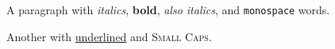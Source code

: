 A paragraph with \emph{italics}, \textbf{bold}, \textit{also italics}, and \texttt{monospace} words.

Another with \underline{underlined} and \textsc{Small Caps}.
